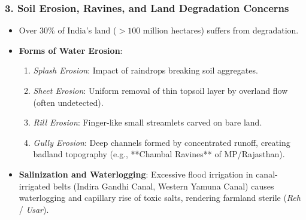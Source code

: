 \documentclass[11pt,a4paper]{article}
\begin{document}
\subsubsection{3. Soil Erosion, Ravines, and Land Degradation Concerns}
\begin{itemize}[leftmargin=*]
  \item Over $30\%$ of India's land ($>100$ million hectares) suffers from degradation.
  \item \textbf{Forms of Water Erosion}:
  \begin{enumerate}
    \item \textit{Splash Erosion}: Impact of raindrops breaking soil aggregates.
    \item \textit{Sheet Erosion}: Uniform removal of thin topsoil layer by overland flow (often undetected).
    \item \textit{Rill Erosion}: Finger-like small streamlets carved on bare land.
    \item \textit{Gully Erosion}: Deep channels formed by concentrated runoff, creating badland topography (e.g., **Chambal Ravines** of MP/Rajasthan).
  \end{enumerate}
  \item \textbf{Salinization and Waterlogging}: Excessive flood irrigation in canal-irrigated belts (Indira Gandhi Canal, Western Yamuna Canal) causes waterlogging and capillary rise of toxic salts, rendering farmland sterile (\textit{Reh} / \textit{Usar}).
\end{itemize}
\end{document}
